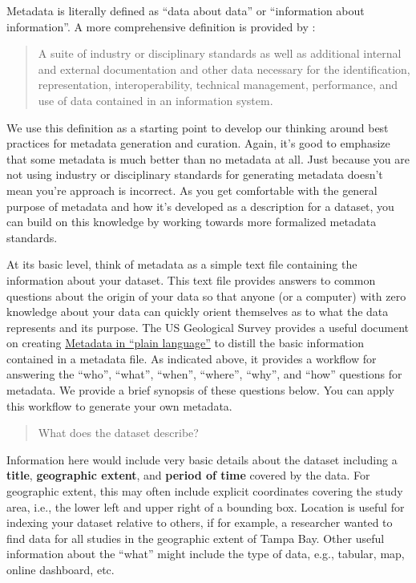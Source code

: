 \documentclass[
]{book}
\begin{document}
Metadata is literally defined as ``data about data'' or ``information about information''. A more comprehensive definition is provided by \citet{Gilliland16}:

\begin{quote}
A suite of industry or disciplinary standards as well as additional internal and external documentation and other data necessary for the identification, representation, interoperability, technical management, performance, and use of data contained in an information system.
\end{quote}

We use this definition as a starting point to develop our thinking around best practices for metadata generation and curation. Again, it's good to emphasize that some metadata is much better than no metadata at all. Just because you are not using industry or disciplinary standards for generating metadata doesn't mean you're approach is incorrect. As you get comfortable with the general purpose of metadata and how it's developed as a description for a dataset, you can build on this knowledge by working towards more formalized metadata standards.

At its basic level, think of metadata as a simple text file containing the information about your dataset. This text file provides answers to common questions about the origin of your data so that anyone (or a computer) with zero knowledge about your data can quickly orient themselves as to what the data represents and its purpose. The US Geological Survey provides a useful document on creating \href{https://prd-wret.s3.us-west-2.amazonaws.com/assets/palladium/production/atoms/files/Metadata\%20in\%20Plain\%20Language_508compliant.pdf}{Metadata in ``plain language''} to distill the basic information contained in a metadata file. As indicated above, it provides a workflow for answering the ``who'', ``what'', ``when'', ``where'', ``why'', and ``how'' questions for metadata. We provide a brief synopsis of these questions below. You can apply this workflow to generate your own metadata.

\begin{quote}
What does the dataset describe?
\end{quote}

Information here would include very basic details about the dataset including a \textbf{title}, \textbf{geographic extent}, and \textbf{period of time} covered by the data. For geographic extent, this may often include explicit coordinates covering the study area, i.e., the lower left and upper right of a bounding box. Location is useful for indexing your dataset relative to others, if for example, a researcher wanted to find data for all studies in the geographic extent of Tampa Bay. Other useful information about the ``what'' might include the type of data, e.g., tabular, map, online dashboard, etc.
\end{document}
